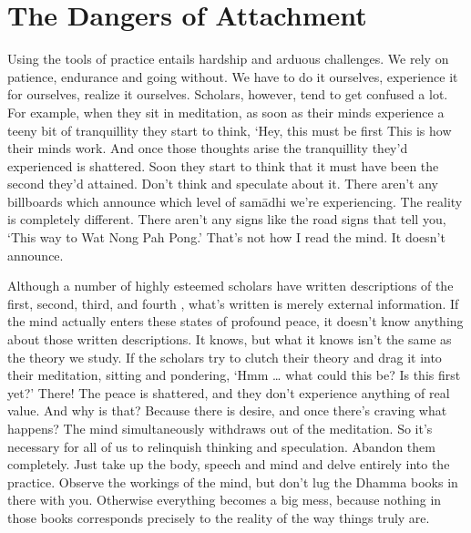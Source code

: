 \section*{The Dangers of Attachment}

Using the tools of practice entails hardship and arduous challenges. We rely on patience, endurance and going without. We have to do it ourselves, experience it for ourselves, realize it ourselves. Scholars, however, tend to get confused a lot. For example, when they sit in meditation, as soon as their minds experience a teeny bit of tranquillity they start to think, `Hey, this must be first  This is how their minds work. And once those thoughts arise the tranquillity they'd experienced is shattered. Soon they start to think that it must have been the second  they'd attained. Don't think and speculate about it. There aren't any billboards which announce which level of sam\=adhi we're experiencing. The reality is completely different. There aren't any signs like the road signs that tell you, `This way to Wat Nong Pah Pong.' That's not how I read the mind. It doesn't announce.

Although a number of highly esteemed scholars have written descriptions of the first, second, third, and fourth , what's written is merely external information. If the mind actually enters these states of profound peace, it doesn't know anything about those written descriptions. It knows, but what it knows isn't the same as the theory we study. If the scholars try to clutch their theory and drag it into their meditation, sitting and pondering, `Hmm \ldots{} what could this be? Is this first  yet?' There! The peace is shattered, and they don't experience anything of real value. And why is that? Because there is desire, and once there's craving what happens? The mind simultaneously withdraws out of the meditation. So it's necessary for all of us to relinquish thinking and speculation. Abandon them completely. Just take up the body, speech and mind and delve entirely into the practice. Observe the workings of the mind, but don't lug the Dhamma books in there with you. Otherwise everything becomes a big mess, because nothing in those books corresponds precisely to the reality of the way things truly are.

